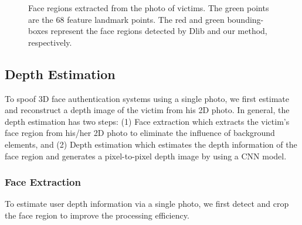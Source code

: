 \begin{figure}[pt]
	\centering
	\vspace{-0.1in}
	\caption{Face regions extracted from the photo of victims. The green points are the 68 feature landmark points. The red and green bounding-boxes represent the face regions detected by Dlib and our method, respectively.}
	\label{face_extraction}
	\vspace{-0.15in}
\end{figure}

\subsection{Depth Estimation}
To spoof 3D face authentication systems using a single photo, we first estimate and reconstruct a depth image of the victim from his 2D photo. In general, the depth estimation has two steps: (1) Face extraction which extracts the victim's face region from his/her 2D photo to eliminate the influence of background elements, and (2) Depth estimation which estimates the depth information of the face region and generates a pixel-to-pixel depth image by using a CNN model.

\subsubsection{Face Extraction}
To estimate user depth information via a single photo, we first detect and crop the face region to improve the processing efficiency.

